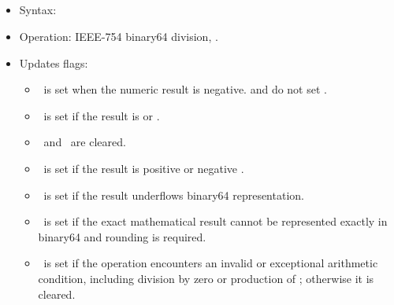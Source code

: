 \subsection{}

\begin{itemize}
\item Syntax: 
\item Operation: IEEE-754 binary64 division,
      .
\item Updates flags:
      \begin{itemize}
      \item \flagN\ is set when the numeric result is negative.
             and  do not set \flagN.
      \item \flagZ\ is set if the result is  or .
      \item \flagC\ and \flagV\ are cleared.
      \item \flagI\ is set if the result is positive or negative .
      \item \flagU\ is set if the result underflows binary64 representation.
      \item \flagX\ is set if the exact mathematical result cannot be represented
            exactly in binary64 and rounding is required.
      \item \flagE\ is set if the operation encounters an invalid or exceptional
            arithmetic condition, including division by zero or production of
            ; otherwise it is cleared.
      \end{itemize}
\end{itemize}

\subsection{}

